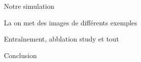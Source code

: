 \documentclass{beamer}
\begin{document}
	\begin{frame}{Notre simulation}
		
		La on met des images de différents exemples
		
	\end{frame}
	
	\begin{frame}{Entraînement, abblation study et tout}
	\end{frame}
	
	\begin{frame}{Conclusion}
		
		
		
	\end{frame}
	
\end{document}
